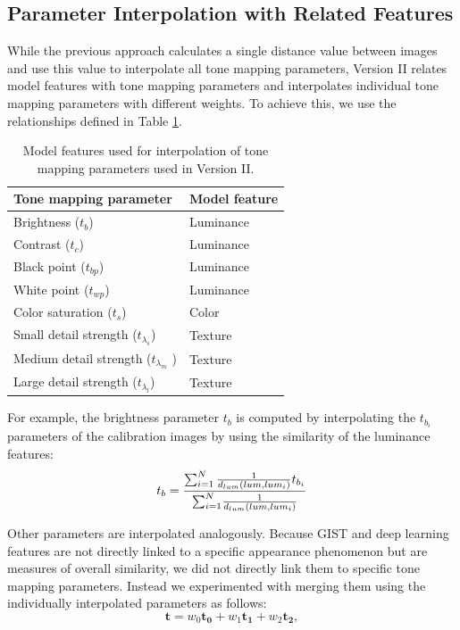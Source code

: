 \subsection{Parameter Interpolation with Related Features}
While the previous approach calculates a single distance value between images and use this value to interpolate all tone mapping parameters, Version II relates model features with tone mapping parameters and interpolates individual tone mapping parameters with different weights. To achieve this, we use the relationships defined in Table \ref{tab:feature_mapping}.

\begin{table}
\caption{Model features used for interpolation of tone mapping parameters used in Version II.}
\centering
\begin{tabular}{l | l}
\label{tab:feature_mapping}
\textbf{Tone mapping parameter} & \textbf{Model feature}\\
\hline
Brightness ($t_b$) & Luminance \\
Contrast ($t_c$) & Luminance \\
Black point ($t_{bp}$) & Luminance \\
White point ($t_{wp}$) & Luminance \\
Color saturation ($t_s$) & Color \\
Small detail strength ($t_{\lambda_s}$) & Texture \\
Medium detail strength ($t_{\lambda_m}$ ) & Texture \\
Large detail strength ($t_{\lambda_l}$) & Texture
\end{tabular}
\end{table}


For example, the brightness parameter $t_b$  is computed by interpolating the $t_{b_i}$ parameters of the calibration images by using the similarity of the luminance features:
\begin{equation}
   t_b = { {\sum_{i=1}^N { {1} \over {d_{lum} (lum, lum_i)} } t_{b_i} } \over {\sum_{i=1}^N} { {1} \over {d_{lum} (lum, lum_i)} } }
\end{equation}

Other parameters are interpolated analogously. Because GIST and deep learning features are not directly linked to a specific appearance phenomenon but are measures of overall similarity, we did not directly link them to specific tone mapping parameters. Instead we experimented with merging them using the individually interpolated parameters as follows:
\begin{equation}
   \mathbf{t} = w_0\mathbf{t_0} + w_1\mathbf{t_1} + w_2\mathbf{t_2}, 
\end{equation}

